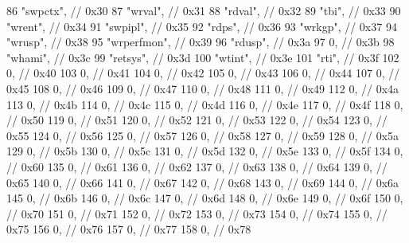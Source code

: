 \begin{DoxyCode}
{{86         "swpctx",       // 0x30
87         "wrval",        // 0x31
88         "rdval",        // 0x32
89         "tbi",          // 0x33
90         "wrent",        // 0x34
91         "swpipl",       // 0x35
92         "rdps",         // 0x36
93         "wrkgp",        // 0x37
94         "wrusp",        // 0x38
95         "wrperfmon",    // 0x39
96         "rdusp",        // 0x3a
97         0,              // 0x3b
98         "whami",        // 0x3c
99         "retsys",       // 0x3d
100         "wtint",        // 0x3e
101         "rti",          // 0x3f
102         0,              // 0x40
103         0,              // 0x41
104         0,              // 0x42
105         0,              // 0x43
106         0,              // 0x44
107         0,              // 0x45
108         0,              // 0x46
109         0,              // 0x47
110         0,              // 0x48
111         0,              // 0x49
112         0,              // 0x4a
113         0,              // 0x4b
114         0,              // 0x4c
115         0,              // 0x4d
116         0,              // 0x4e
117         0,              // 0x4f
118         0,              // 0x50
119         0,              // 0x51
120         0,              // 0x52
121         0,              // 0x53
122         0,              // 0x54
123         0,              // 0x55
124         0,              // 0x56
125         0,              // 0x57
126         0,              // 0x58
127         0,              // 0x59
128         0,              // 0x5a
129         0,              // 0x5b
130         0,              // 0x5c
131         0,              // 0x5d
132         0,              // 0x5e
133         0,              // 0x5f
134         0,              // 0x60
135         0,              // 0x61
136         0,              // 0x62
137         0,              // 0x63
138         0,              // 0x64
139         0,              // 0x65
140         0,              // 0x66
141         0,              // 0x67
142         0,              // 0x68
143         0,              // 0x69
144         0,              // 0x6a
145         0,              // 0x6b
146         0,              // 0x6c
147         0,              // 0x6d
148         0,              // 0x6e
149         0,              // 0x6f
150         0,              // 0x70
151         0,              // 0x71
152         0,              // 0x72
153         0,              // 0x73
154         0,              // 0x74
155         0,              // 0x75
156         0,              // 0x76
157         0,              // 0x77
158         0,              // 0x78
}}
\end{DoxyCode}
